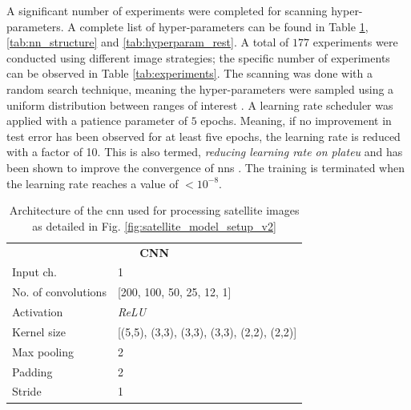 A significant number of experiments were completed for scanning hyper-parameters. A complete list of hyper-parameters can be found in Table \ref{tab:cnn_structure}, \ref{tab:nn_structure} and \ref{tab:hyperparam_rest}. A total of $177$ experiments were conducted using different image strategies; the specific number of experiments can be observed in Table \ref{tab:experiments}. The scanning was done with a random search technique, meaning the hyper-parameters were sampled using a uniform distribution between ranges of interest \cite{Bergstra2012RandomOptimization}. A learning rate scheduler was applied with a patience parameter of $5$ epochs. Meaning, if no improvement in test error has been observed for at least five epochs, the learning rate is reduced with a factor of 10. This is also termed, \emph{reducing learning rate on plateu} and has been shown to improve the convergence of \glspl{nn} \cite{SmithSuper-Convergence:Rates}. The training is terminated when the learning rate reaches a value of $< 10^{-8}$.

\def\arraystretch{1.5}
\begin{table}[]
\begin{center}
\begin{tabular}{ll}
\multicolumn{2}{c}{\textbf{CNN}}                                                       \\
\multicolumn{1}{l|}{Input ch.}           & 1                                          \\ \hline
\multicolumn{1}{l|}{No. of convolutions} & [200, 100, 50, 25, 12, 1]                  \\ \hline
\multicolumn{1}{l|}{Activation}          & \emph{ReLU}                                       \\ \hline
\multicolumn{1}{l|}{Kernel size}         & [(5,5), (3,3), (3,3), (3,3), (2,2), (2,2)] \\ \hline
\multicolumn{1}{l|}{Max pooling}         & 2                                          \\ \hline
\multicolumn{1}{l|}{Padding}             & 2                                          \\ \hline
\multicolumn{1}{l|}{Stride}              & 1                                         
\end{tabular}
\end{center}
\caption{Architecture of the \gls{cnn} used for processing satellite images as detailed in Fig. \ref{fig:satellite_model_setup_v2}}\label{tab:cnn_structure}
\end{table}



